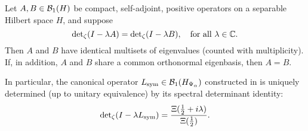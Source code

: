 \begin{lemma}
\label{lem:uniqueness_from_determinant}
Let \( A, B \in \mathcal{B}_1(H) \) be compact, self-adjoint, positive operators on a separable Hilbert space \( H \), and suppose
\[
\det\nolimits_{\zeta}(I - \lambda A) = \det\nolimits_{\zeta}(I - \lambda B), \quad \text{for all } \lambda \in \mathbb{C}.
\]
Then \( A \) and \( B \) have identical multisets of eigenvalues (counted with multiplicity). If, in addition, \( A \) and \( B \) share a common orthonormal eigenbasis, then \( A = B \).

\medskip
\noindent
In particular, the canonical operator \( L_{\mathrm{sym}} \in \mathcal{B}_1(H_{\Psi_\alpha}) \) constructed in  is uniquely determined (up to unitary equivalence) by its spectral determinant identity:
\[
\det\nolimits_{\zeta}(I - \lambda L_{\mathrm{sym}}) = \frac{\Xi(\tfrac{1}{2} + i\lambda)}{\Xi(\tfrac{1}{2})}.
\]
\end{lemma}
